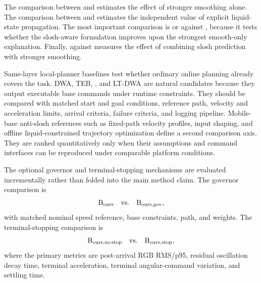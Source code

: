 The comparison between \Bsmooth{} and \Bzero{} estimates the effect of stronger smoothing alone.
The comparison between \Bslosh{} and \Bzero{} estimates the independent value of explicit liquid-state propagation.
The most important comparison is \Bslosh{} or \Bours{} against \Bsmooth{}, because it tests whether the slosh-aware formulation improves upon the strongest smooth-only explanation.
Finally, \Bours{} against \Bslosh{} measures the effect of combining slosh prediction with stronger smoothing.

Same-layer local-planner baselines test whether ordinary online planning already covers the task.
DWA, TEB, \MpcLocalPlanner{}, and LT-DWA are natural candidates because they output executable base commands under runtime constraints.
They should be compared with matched start and goal conditions, reference path, velocity and acceleration limits, arrival criteria, failure criteria, and logging pipeline.
Mobile-base anti-slosh references such as fixed-path velocity profiles, input shaping, and offline liquid-constrained trajectory optimization define a second comparison axis.
They are ranked quantitatively only when their assumptions and command interfaces can be reproduced under comparable platform conditions.

The optional governor and terminal-stopping mechanisms are evaluated incrementally rather than folded into the main method claim.
The governor comparison is
\begin{equation}
  \mathrm{B}_{\mathrm{ours}}{} \quad \text{vs.} \quad \mathrm{B}_{\mathrm{ours,gov}}{},
\end{equation}
with matched nominal speed reference, base constraints, path, and \SPMPC{} weights.
The terminal-stopping comparison is
\begin{equation}
  \mathrm{B}_{\mathrm{ours,no\,stop}}{} \quad \text{vs.} \quad \mathrm{B}_{\mathrm{ours,stop}}{},
\end{equation}
where the primary metrics are post-arrival RGB RMS/p95, residual oscillation decay time, terminal acceleration, terminal angular-command variation, and settling time.
